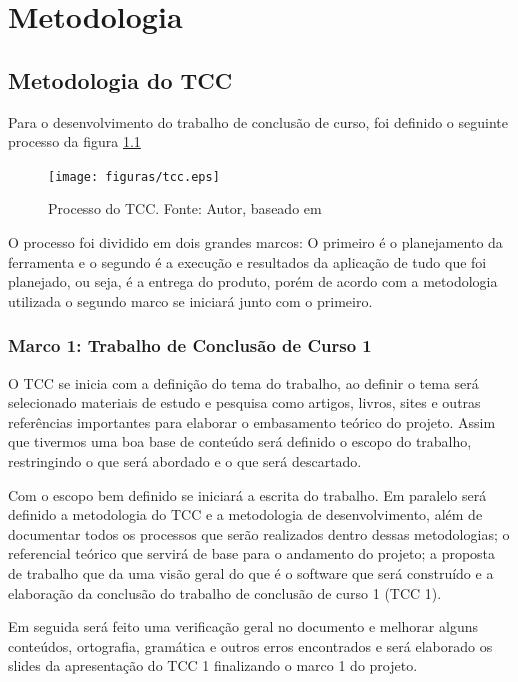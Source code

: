 \chapter{Metodologia}

\section{Metodologia do TCC}

Para o desenvolvimento do trabalho de conclusão de curso, foi definido o seguinte processo da figura \ref{fig:tcc}

\begin{figure}[h!]
	\centering
  \texttt{[image: figuras/tcc.eps]}
  \caption[Processo do TCC.]{Processo do TCC. Fonte: Autor, baseado em \cite{leonardo}}
	\label{fig:tcc}
\end{figure}


O processo foi dividido em dois grandes marcos: O primeiro é o planejamento da ferramenta e o segundo é a execução e resultados da aplicação de tudo que foi planejado, ou seja, é a entrega do produto, porém de acordo com a metodologia utilizada o segundo marco se iniciará junto com o primeiro.

\subsection{Marco 1: Trabalho de Conclusão de Curso 1}

O TCC se inicia com a definição do tema do trabalho, ao definir o tema será selecionado materiais de estudo e pesquisa como artigos, livros, sites e outras referências importantes para elaborar o embasamento teórico do projeto. Assim que tivermos uma boa base de conteúdo será definido o escopo do trabalho, restringindo o que será abordado e o que será descartado.

Com o escopo bem definido se iniciará a escrita do trabalho. Em paralelo será definido a metodologia do TCC e a metodologia de desenvolvimento, além de documentar todos os processos que serão realizados dentro dessas metodologias; o referencial teórico que servirá de base para o andamento do projeto; a proposta de trabalho que da uma visão geral do que é o software que será construído e a elaboração da conclusão do trabalho de conclusão de curso 1 (TCC 1).

Em seguida será feito uma verificação geral no documento e melhorar alguns conteúdos, ortografia, gramática e outros erros encontrados e será elaborado os slides da apresentação do TCC 1 finalizando o marco 1 do projeto.

